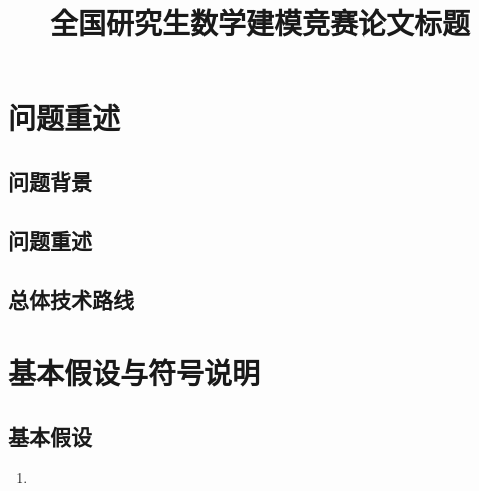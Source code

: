 \documentclass[bwprint]{gmcmthesis}
\title{全国研究生数学建模竞赛论文标题}
\begin{document}
\maketitle

\begin{abstract}
\end{abstract}

\pagestyle{plain}
\maketoc
\clearpage

\section{问题重述}

\subsection{问题背景}

\subsection{问题重述}

\subsection{总体技术路线}

\section{基本假设与符号说明}

\subsection{基本假设}
\begin{enumerate}
    \item %
\end{enumerate}
\end{document}

